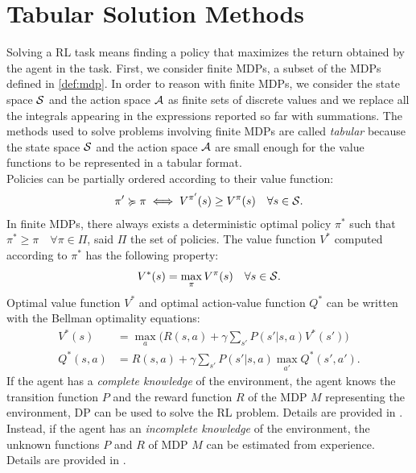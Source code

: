 \section{Tabular Solution Methods}\label{sec:tabmet}
Solving a \ac{RL} task means finding a policy that maximizes the return obtained by the agent in the task. First, we consider finite \ac{MDPs}, a subset of the \ac{MDPs} defined in \ref{def:mdp}. In order to reason with finite \ac{MDPs}, we consider the state space $\mathcal{S}$ and the action space $\mathcal{A}$ as finite sets of discrete values and we replace all the integrals appearing in the expressions reported so far with summations. The methods used to solve problems involving finite \ac{MDPs} are called \emph{tabular} because the state space $\mathcal{S}$ and the action space $\mathcal{A}$ are small enough for the value functions to be represented in a tabular format.\\
\newline
Policies can be partially ordered according to their value function: 
\begin{align}
\pi' \succcurlyeq \pi \iff V^{\pi'}(s) \geq V^{\pi}(s) \quad \forall s \in \mathcal{S}. \label{eq:ordpol}
\end{align} 
In finite \ac{MDPs}, there always exists a deterministic optimal policy $\pi^{*}$ such that $\pi^{*} \geq \pi \quad \forall \pi \in \Pi$, said $\Pi$ the set of policies. The value function $V^{*}$ computed according to $\pi^{*}$ has the following property:
\begin{align} V^{*}(s) = \max_{\pi}V^{\pi}(s) \quad \forall s \in \mathcal{S}. \end{align}
Optimal value function $V^{*}$ and optimal action-value function $Q^{*}$ can be written with the Bellman optimality equations:
\begin{align}
V^{*}(s) &= \max_a \Big( R(s,a) + \gamma \sum_{s'}P(s'|s,a)   V^{*}(s') \Big)\\
Q^{*}(s,a) &= R(s,a) + \gamma \sum_{s'}P(s'|s,a) \max_{a'} Q^{*}(s', a').
\end{align}
If the agent has a \emph{complete knowledge} of the environment, \ie the agent knows the transition function $P$ and the reward function $R$ of the \ac{MDP} $M$ representing the environment, \acf{DP} can be used to solve the \ac{RL} problem. Details are provided in . Instead, if the agent has an \emph{incomplete knowledge} of the environment, the unknown functions $P$ and $R$ of \ac{MDP} $M$ can be estimated from experience. Details are provided in .\\
